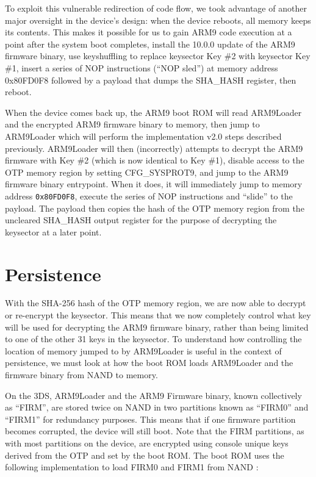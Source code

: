 \documentclass[journal]{IEEEtran}
\begin{document}
To exploit this vulnerable redirection of code flow, we took advantage of
another major oversight in the device's design: when the device reboots, all
memory keeps its contents. This makes it possible for us to gain ARM9 code
execution at a point after the system boot completes, install the 10.0.0 update
of the ARM9 firmware binary, use keyshuffling to replace keysector Key \#2 with
keysector Key \#1, insert a series of NOP instructions (``NOP sled'') at memory
address 0x80FD0F8 followed by a payload that dumps the SHA\_HASH register, then
reboot.

When the device comes back up, the ARM9 boot ROM will read ARM9Loader and the
encrypted ARM9 firmware binary to memory, then jump to ARM9Loader which will
perform the implementation v2.0 steps described previously. ARM9Loader will then
(incorrectly) attempts to decrypt the ARM9 firmware with Key \#2 (which is now
identical to Key \#1), disable access to the OTP memory region by setting
CFG\_SYSPROT9, and jump to the ARM9 firmware binary entrypoint. When it does, it
will immediately jump to memory address \texttt{0x80FD0F8}, execute the series
of NOP instructions and ``slide'' to the payload. The payload then copies the hash
of the OTP memory region from the uncleared SHA\_HASH output register for the
purpose of decrypting the keysector at a later point.

\section{Persistence}

With the SHA-256 hash of the OTP memory region, we are now able to decrypt or
re-encrypt the keysector. This means that we now completely control what key
will be used for decrypting the ARM9 firmware binary, rather than being limited
to one of the other 31 keys in the keysector. To understand how controlling the
location of memory jumped to by ARM9Loader is useful in the context of
persistence, we must look at how the boot ROM loads ARM9Loader and the firmware
binary from NAND to memory.

On the 3DS, ARM9Loader and the ARM9 Firmware binary, known collectively as
``FIRM'', are stored twice on NAND in two partitions known as ``FIRM0'' and ``FIRM1''
for redundancy purposes. This means that if one firmware partition becomes
corrupted, the device will still boot. Note that the FIRM partitions, as with
most partitions on the device, are encrypted using console unique keys derived
from the OTP and set by the boot ROM. The boot ROM uses the following
implementation to load FIRM0 and FIRM1 from NAND
\cite{clevermind}\cite{Bootloader}\cite{OTP_Registers}:
\end{document}
